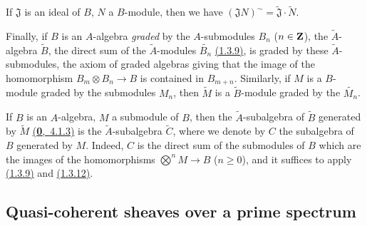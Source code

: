 \begin{env}[1.3.13]
If $\mathfrak{J}$ is an ideal of $B$, $N$ a $B$-module, then we have
$(\mathfrak{J}N)^\sim=\widetilde{\mathfrak{J}}\cdot\widetilde{N}$.

Finally, if $B$ is an $A$-algebra {\em graded} by the $A$-submodules $B_n$ ($n\in\mathbf{Z}$),
the $\widetilde{A}$-algebra $\widetilde{B}$, the direct sum of the $\widetilde{A}$-modules
$\widetilde{B_n}$ \hyperref[cor-1.1.3.9]{(1.3.9)}, is graded by these $\widetilde{A}$-submodules, the axiom
of graded algebras giving that the image of the homomorphism $B_m\otimes B_n\to B$ is
contained in $B_{m+n}$. Similarly, if $M$ is a $B$-module graded by the submodules $M_n$,
then $\widetilde{M}$ is a $\widetilde{B}$-module graded by the $\widetilde{M_n}$.
\end{env}

\begin{env}[1.3.14]
\label{env-1.1.3.14}
If $B$ is an $A$-algebra, $M$ a submodule of $B$, then the $\widetilde{A}$-subalgebra of
$\widetilde{B}$ generated by $\widetilde{M}$ \hyperref[env-0.4.1.3]{(\textbf{0},~4.1.3)} is the
$\widetilde{A}$-subalgebra $\widetilde{C}$, where we denote by $C$ the subalgebra of $B$
generated by $M$. Indeed, $C$ is the direct sum of the submodules of $B$ which are the images
of the homomorphisms $\bigotimes^n M\to B$ ($n\geqslant 0$), and it suffices to apply
\hyperref[cor-1.1.3.9]{(1.3.9)} and \hyperref[cor-1.1.3.12]{(1.3.12)}.
\end{env}

\subsection{Quasi-coherent sheaves over a prime spectrum}
\label{subsection-qcoh-sheaves-over-spec}

